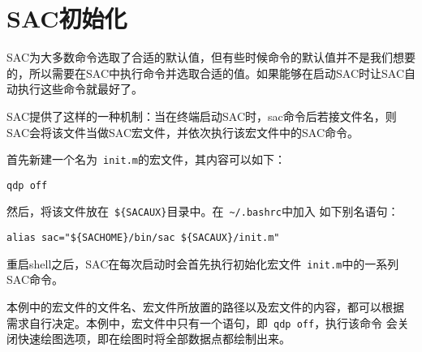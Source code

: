\section{SAC初始化}
\label{sec:init-macro}
SAC为大多数命令选取了合适的默认值，但有些时候命令的默认值并不是我们想要的，所以需要在SAC中执行命令并选取合适的值。如果能够在启动SAC时让SAC自动执行这些命令就最好了。

SAC提供了这样的一种机制：当在终端启动SAC时，sac命令后若接文件名，则SAC会将该文件当做SAC宏文件，并依次执行该宏文件中的SAC命令。

首先新建一个名为~\verb+init.m+的宏文件，其内容可以如下：
\begin{verbatim}
qdp off
\end{verbatim}

然后，将该文件放在~\verb+${SACAUX}+目录中。在~\verb+~/.bashrc+中加入
如下别名语句：
\begin{verbatim}
alias sac="${SACHOME}/bin/sac ${SACAUX}/init.m"
\end{verbatim}

重启shell之后，SAC在每次启动时会首先执行初始化宏文件~\verb+init.m+中的一系列SAC命令。

本例中的宏文件的文件名、宏文件所放置的路径以及宏文件的内容，都可以根据
需求自行决定。本例中，宏文件中只有一个语句，即~\verb+qdp off+，执行该命令
会关闭快速绘图选项，即在绘图时将全部数据点都绘制出来。
